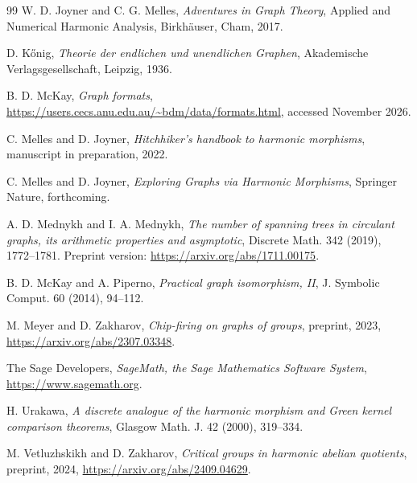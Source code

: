 \documentclass[12pt,letterpaper]{article}
\theoremstyle{definition}
\begin{document}
\begin{thebibliography}{99}
W. D. Joyner and C. G. Melles,
{\it Adventures in Graph Theory},
Applied and Numerical Harmonic Analysis, Birkh\"auser, Cham, 2017.

D. K\H{o}nig,
{\it Theorie der endlichen und unendlichen Graphen},
Akademische Verlagsgesellschaft, Leipzig, 1936.

B. D. McKay,
{\it Graph formats},
\url{https://users.cecs.anu.edu.au/~bdm/data/formats.html},
accessed November 2026.

C. Melles and D. Joyner,
{\it Hitchhiker's handbook to harmonic morphisms},
manuscript in preparation, 2022.

C. Melles and D. Joyner,
{\it Exploring Graphs via Harmonic Morphisms},
Springer Nature, forthcoming.

A. D. Mednykh and I. A. Mednykh,
{\it The number of spanning trees in circulant graphs, its arithmetic
properties and asymptotic},
Discrete Math. 342 (2019), 1772--1781.
Preprint version: \url{https://arxiv.org/abs/1711.00175}.

B. D. McKay and A. Piperno,
{\it Practical graph isomorphism, II},
J. Symbolic Comput. 60 (2014), 94--112.

M. Meyer and D. Zakharov,
{\it Chip-firing on graphs of groups},
preprint, 2023, \url{https://arxiv.org/abs/2307.03348}.

The Sage Developers,
{\it SageMath, the Sage Mathematics Software System},
\url{https://www.sagemath.org}.

H. Urakawa,
{\it A discrete analogue of the harmonic morphism and Green kernel
comparison theorems},
Glasgow Math. J. 42 (2000), 319--334.

M. Vetluzhskikh and D. Zakharov,
{\it Critical groups in harmonic abelian quotients},
preprint, 2024, \url{https://arxiv.org/abs/2409.04629}.

\end{thebibliography}


\printindex
\end{document}
